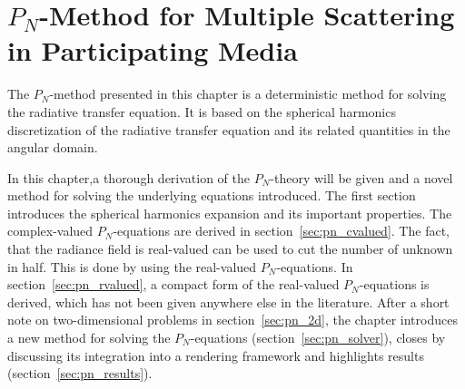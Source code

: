 \chapter{$P_N$-Method for Multiple Scattering in Participating Media}
%
\label{sec:pnmethod}

The $P_N$-method presented in this chapter is a deterministic method for solving the radiative transfer equation. It is based on the spherical harmonics discretization of the radiative transfer equation and its related quantities in the angular domain. 

In this chapter,a thorough derivation of the $P_N$-theory will be given and a novel method for solving the underlying equations introduced. The first section introduces the spherical harmonics expansion and its important properties. The complex-valued $P_N$-equations are derived in section~\ref{sec:pn_cvalued}. The fact, that the radiance field is real-valued can be used to cut the number of unknown in half. This is done by using the real-valued $P_N$-equations. In section~\ref{sec:pn_rvalued}, a compact form of the real-valued $P_N$-equations is derived, which has not been given anywhere else in the literature. After a short note on two-dimensional problems in section~\ref{sec:pn_2d}, the chapter introduces a new method for solving the $P_N$-equations (section~\ref{sec:pn_solver}), closes by discussing its integration into a rendering framework and highlights results (section~\ref{sec:pn_results}).








